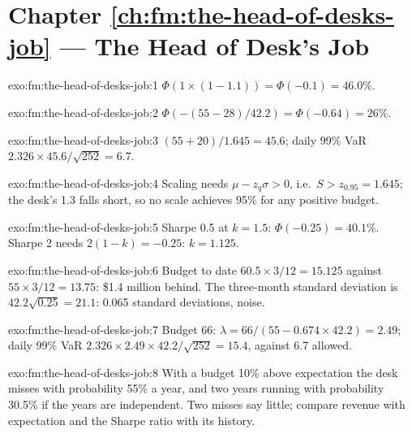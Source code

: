 \section*{Chapter \ref{ch:fm:the-head-of-desks-job} --- The Head of Desk's Job}

\begin{solution}{exo:fm:the-head-of-desks-job:1}
$\Phi(1\times(1-1.1))=\Phi(-0.1)=46.0\%$.
\end{solution}

\begin{solution}{exo:fm:the-head-of-desks-job:2}
$\Phi(-(55-28)/42.2)=\Phi(-0.64)=26\%$.
\end{solution}

\begin{solution}{exo:fm:the-head-of-desks-job:3}
$(55+20)/1.645=45.6$; daily 99\% VaR $2.326\times45.6/\sqrt{252}=6.7$.
\end{solution}

\begin{solution}{exo:fm:the-head-of-desks-job:4}
Scaling needs $\mu-z_q\sigma>0$, i.e.\ $S>z_{0.95}=1.645$; the desk's 1.3 falls short, so no scale achieves 95\% for any positive budget.
\end{solution}

\begin{solution}{exo:fm:the-head-of-desks-job:5}
Sharpe 0.5 at $k=1.5$: $\Phi(-0.25)=40.1\%$. Sharpe 2 needs $2(1-k)=-0.25$: $k=1.125$.
\end{solution}

\begin{solution}{exo:fm:the-head-of-desks-job:6}
Budget to date $60.5\times3/12=15.125$ against $55\times3/12=13.75$: \$1.4 million behind. The three-month standard deviation is
$42.2\sqrt{0.25}=21.1$: 0.065 standard deviations, noise.
\end{solution}

\begin{solution}{exo:fm:the-head-of-desks-job:7}
Budget 66: $\lambda=66/(55-0.674\times42.2)=2.49$; daily 99\% VaR $2.326\times2.49\times42.2/\sqrt{252}=15.4$, against 6.7 allowed.
\end{solution}

\begin{solution}{exo:fm:the-head-of-desks-job:8}
With a budget 10\% above expectation the desk misses with probability 55\% a year, and two years running with probability 30.5\% if the years are
independent. Two misses say little; compare revenue with expectation and the Sharpe ratio with its history.
\end{solution}

